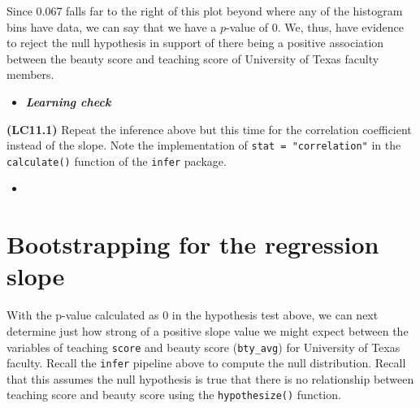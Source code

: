 \documentclass[12pt,]{krantz}
\makeatletter
\newenvironment{Shaded}{\begin{snugshade}}{\end{snugshade}}
\newcommand{\KeywordTok}[1]{\textcolor[rgb]{0.27,0.27,0.27}{\textbf{#1}}}
\newcommand{\DataTypeTok}[1]{\textcolor[rgb]{0.27,0.27,0.27}{#1}}
\newcommand{\DecValTok}[1]{\textcolor[rgb]{0.06,0.06,0.06}{#1}}
\newcommand{\StringTok}[1]{\textcolor[rgb]{0.5,0.5,0.5}{#1}}
\newcommand{\OperatorTok}[1]{\textcolor[rgb]{0.43,0.43,0.43}{\textbf{#1}}}
\newcommand{\NormalTok}[1]{#1}
\newenvironment{kframe}{%
\medskip{}
\setlength{\fboxsep}{.8em}
 \def\at@end@of@kframe{}%
 \ifinner\ifhmode%
  \def\at@end@of@kframe{\end{minipage}}%
  \begin{minipage}{\columnwidth}%
 \fi\fi%
 \def\FrameCommand##1{\hskip\@totalleftmargin \hskip-\fboxsep
 \colorbox{shadecolor}{##1}\hskip-\fboxsep
     \hskip-\linewidth \hskip-\@totalleftmargin \hskip\columnwidth}%
 \MakeFramed {\advance\hsize-\width
   \@totalleftmargin\z@ \linewidth\hsize
   \@setminipage}}%
 {\par\unskip\endMakeFramed%
 \at@end@of@kframe}
\renewenvironment{Shaded}{\begin{kframe}}{\end{kframe}}
\newenvironment{rmdblock}[1]
  {\begin{shaded*}
  \begin{itemize}
  \renewcommand{\labelitemi}{
    \raisebox{-.7\height}[0pt][0pt]{
    }
  }
  \item
  }
  {
  \end{itemize}
  \end{shaded*}
  }
\newenvironment{learncheck}
  {\begin{rmdblock}{warning}}
  {\end{rmdblock}}
\makeatother
\begin{document}
Since 0.067 falls far to the right of this plot beyond where any of the
histogram bins have data, we can say that we have a \(p\)-value of 0.
We, thus, have evidence to reject the null hypothesis in support of
there being a positive association between the beauty score and teaching
score of University of Texas faculty members.

\begin{learncheck}
\textbf{\emph{Learning check}}
\end{learncheck}

\textbf{(LC11.1)} Repeat the inference above but this time for the
correlation coefficient instead of the slope. Note the implementation of
\texttt{stat\ =\ "correlation"} in the \texttt{calculate()} function of
the \texttt{infer} package.

\begin{learncheck}

\end{learncheck}

\section{Bootstrapping for the regression
slope}\label{bootstrapping-for-the-regression-slope}

With the p-value calculated as 0 in the hypothesis test above, we can
next determine just how strong of a positive slope value we might expect
between the variables of teaching \texttt{score} and beauty score
(\texttt{bty\_avg}) for University of Texas faculty. Recall the
\texttt{infer} pipeline above to compute the null distribution. Recall
that this assumes the null hypothesis is true that there is no
relationship between teaching score and beauty score using the
\texttt{hypothesize()} function.

\begin{Shaded}
\end{Shaded}
\end{document}
